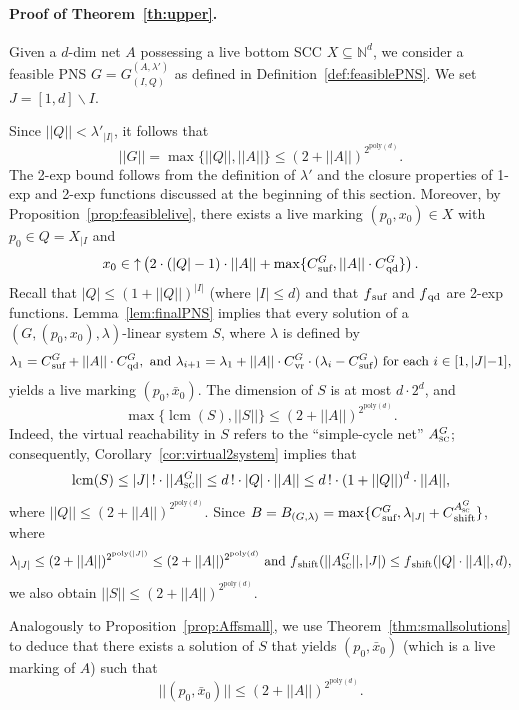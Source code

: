 \documentclass[11pt,a4paper]{amsart}
\newcommand{\nnorm}[1]{||#1||}
\newcommand{\vr}{{}_\textnormal{vr}}
\newcommand{\upC}[1]{\mathop{\uparrow}#1}
\newcommand{\suf}{{}_\textnormal{suf}}
\newcommand{\shift}{{}_\textnormal{shift}}
\newcommand{\qd}{{}_\textnormal{qd}}
\newcommand{\ASC}{A_{\textsc{sc}}}
\newcommand{\Nat}{\mathbb{N}}
\newcommand{\restr}[1]{_{|{#1}}}
\newcommand{\setN}{\Nat}
\newcommand{\mlcm}[1]{\operatorname{lcm}(#1)}
\let\origtextsc\textsc
\renewcommand{\textsc}[1]{\textnormal{\origtextsc{#1}}}
\theoremstyle{plain}
\theoremstyle{definition}
\theoremstyle{defC}
\theoremstyle{thmC}
\begin{document}
\paragraph{Proof of Theorem~\ref{th:upper}.} 

Given a $d$-dim
net $A$ possessing a live bottom SCC $X\subseteq\setN^d$, we consider 
 a feasible PNS  $G=G_{(I,Q)}^{(A,\lambda')}$ as defined in
Definition~\ref{def:feasiblePNS}. We set $J=[1,d]\smallsetminus I$.

Since $\nnorm{Q}<\lambda'_{|I|}$, it
follows that 
\[\nnorm{G}=\max\{\nnorm{Q},\nnorm{A}\}\leq
(2+\nnorm{A})^{2^{\text{poly}(d)}}.\]
The 2-exp bound follows from the definition of $\lambda'$ and
the closure properties of 1-exp and 2-exp functions discussed at the
beginning of this section.
Moreover, by Proposition~\ref{prop:feasiblelive}, there exists a live	marking
	$(p_0,x_0)\in X$ with $p_0\in Q=X\restr{I}$ and
	\[x_0\in\upC{\left(
2\cdot(|Q|-1)\cdot\nnorm{A}+
		\max\{C\suf^G,\nnorm{A}\cdot C\qd^G\}\right)}.\]
Recall that $|Q|\leq (1+\nnorm{Q})^{|I|}$ (where $|I|\leq d$) and
that $f\suf$ and $f\qd$ are 2-exp functions.
Lemma~\ref{lem:finalPNS} implies that every solution
of a $(G,(p_0,x_0),\lambda)$-linear system $S$, 
where $\lambda$ is defined
by 
\[\lambda_1=
C\suf^G+\nnorm{A}\cdot C\qd^G, \text{ and } 
\lambda_{i+1}= \lambda_1 + \nnorm{A}\cdot C\vr^{G}\cdot
			(\lambda_i-C\suf^G)\text{ for each }
			i\in[1,|J|{-}1],\]
			yields  
a live marking $(p_0,\bar{x}_0)$.
The dimension of $S$ is at most $d\cdot 2^d$, and
\[\max\{\mlcm{S},\nnorm{S}\}\leq (2+\nnorm{A})^{2^{\text{poly}(d)}}.\]
Indeed, the virtual reachability in $S$ refers to the ``simple-cycle
net''  $\ASC^G$; consequently,
Corollary~\ref{cor:virtual2system} implies that 
\[\mlcm{S}\leq |J|\,!\cdot\nnorm{\ASC^G}\leq d\,!\cdot
|Q|\cdot\nnorm{A}\leq  d\,!\cdot (1+\nnorm{Q})^d \cdot\nnorm{A},\]
where $\nnorm{Q}\leq (2+\nnorm{A})^{2^{\text{poly}(d)}}$.
Since
$B=B_{(G,\lambda)}=\max\{C\suf^G,\lambda_{|J|}+C\shift^{\ASC^G}\}$,
where
\begin{equation*}
\lambda_{|J|}\leq (2+\nnorm{A})^{2^{\text{poly}(|J|)}}\leq (2+\nnorm{A})^{2^{\text{poly}(d)}}
	\text{ and }f\shift(\nnorm{\ASC^G},|J|)\leq f\shift(|Q|\cdot \nnorm{A},d),
\end{equation*}
	we also obtain $\nnorm{S}\leq  (2+\nnorm{A})^{2^{\text{poly}(d)}}$.

Analogously to Proposition~\ref{prop:Affsmall}, we use
Theorem~\ref{thm:smallsolutions} to deduce that
there exists a solution of $S$ that yields $(p_0,\bar{x}_0)$ (which is
a live marking of $A$) such that
\[\nnorm{(p_0,\bar{x}_0)}\leq
(2+\nnorm{A})^{2^{\text{poly}(d)}}.\tag*{\qed}\]
\end{document}
